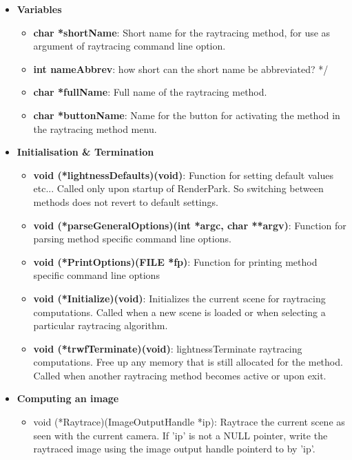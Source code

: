 \documentclass[11pt]{report}
\begin{document}
\begin{itemize}

\item{\bf Variables}
\begin{itemize}
\item {\bf char *shortName}: Short name for the raytracing method, for use 
	as argument of raytracing command line option.

\item {\bf int nameAbbrev}:  how short can the short name be abbreviated? */

\item {\bf char *fullName}:  Full name of the raytracing method.

\item {\bf char *buttonName}: Name for the button for activating the method 
	in the raytracing method menu.
\end{itemize}

\item{\bf Initialisation \& Termination}
\begin{itemize}
\item {\bf void (*lightnessDefaults)(void)}: Function for setting default values etc...
	Called only upon startup of RenderPark. So switching between methods
	does not revert to default settings.

\item {\bf void (*parseGeneralOptions)(int *argc, char **argv)}: Function for parsing
	method specific command line options.

\item {\bf void (*PrintOptions)(FILE *fp)}: Function for printing method 
	specific command line options

\item {\bf void (*Initialize)(void)}: Initializes the current scene for 
	raytracing computations.  Called when a new scene is loaded or
	when selecting a particular raytracing algorithm.

\item{\bf void (*trwfTerminate)(void)}: lightnessTerminate raytracing computations. Free up any
	memory that is still allocated for the method. Called when another
	raytracing method becomes active or upon exit.
\end{itemize}


\item{\bf Computing an image}
\begin{itemize}

\item {void (*Raytrace)(ImageOutputHandle *ip)}: Raytrace the current 
	scene as seen with the current camera. If 'ip' is not a NULL
	pointer, write the raytraced image using the image output
	handle pointerd to by 'ip'.


\end{itemize}
\end{itemize}
\end{document}
